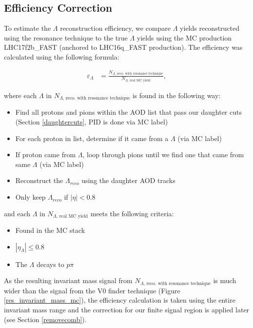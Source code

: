 \documentclass[ALICE,manyauthors]{ALICE_analysis_notes}
\begin{document}
\subsection{Efficiency Correction}
To estimate the $\Lambda$ reconstruction efficiency, we compare $\Lambda$ yields reconstructed using the resonance technique to the true $\Lambda$ yields using the MC production LHC17f2b\_FAST (anchored to LHC16q\_FAST production). The efficiency was calculated using the following formula:

\begin{align*}
	\varepsilon_{\Lambda} &=  \frac{N_{\Lambda\text{, reco. with resonance technique}}}{N_{\Lambda\text{, real MC yield}}},
\end{align*}

where each $\Lambda$ in $N_{\Lambda\text{, reco. with resonance technique}}$ is found in the following way:

\begin{itemize}
	\item Find all protons and pions within the AOD list that pass our daughter cuts (Section \ref{daughtercuts}, PID is done via MC label)
	\item For each proton in list, determine if it came from a $\Lambda$ (via MC label)
	\item If proton came from $\Lambda$, loop through pions until we find one that came from same $\Lambda$ (via MC label)
	\item Reconstruct the $\Lambda_{reco}$ using the daughter AOD tracks
	\item Only keep $\Lambda_{reco}$ if $|\eta| < 0.8$
\end{itemize}

and each $\Lambda$ in $N_{\Lambda\text{, real MC yield}}$ meets the following criteria:

\begin{itemize}
	\item Found in the MC stack
	\item $|\eta_{\Lambda}| \leq 0.8$
	\item The $\Lambda$ decays to $p\pi$
\end{itemize}

As the resulting invariant mass signal from $N_{\Lambda\text{, reco. with resonance technique}}$ is much wider than the signal from the V0 finder technique (Figure \ref{res_invariant_mass_mc}), the efficiency calculation is taken using the entire invariant mass range and the correction for our finite signal region is applied later (see Section \ref{removecomb}).
\end{document}
